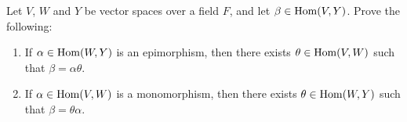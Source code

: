 \probskip



\begin{problem}[Golan 293 \& 294]
Let $V$, $W$ and $Y$ be vector spaces over a field $F$, and
let $\beta \in \operatorname{Hom}(V,Y)$. Prove the following:
\begin{enumerate}
\item  If $\alpha \in \operatorname{Hom}(W, Y)$ is an epimorphism, then 
there exists $\theta \in \operatorname{Hom}(V,W)$ such that $\beta = \alpha \theta$.

\begin{center}
\end{center}

\item  If $\alpha \in \operatorname{Hom}(V, W)$ is a monomorphism, then 
there exists $\theta \in \operatorname{Hom}(W,Y)$ such that $\beta = \theta \alpha$.

\begin{center}
\end{center}

\end{enumerate}




\end{problem}


